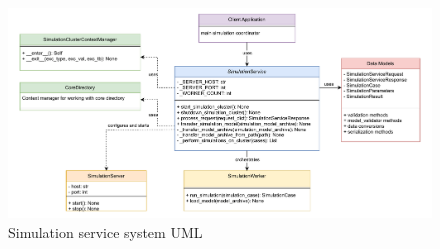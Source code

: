 \begin{figure}[H]
	\centering
	\includegraphics[width=1.0\textwidth]{content/images/SimulationServiceUML.pdf}
	\caption{Simulation service system UML}
	\label{fig:SimulationServiceUML}
\end{figure}

